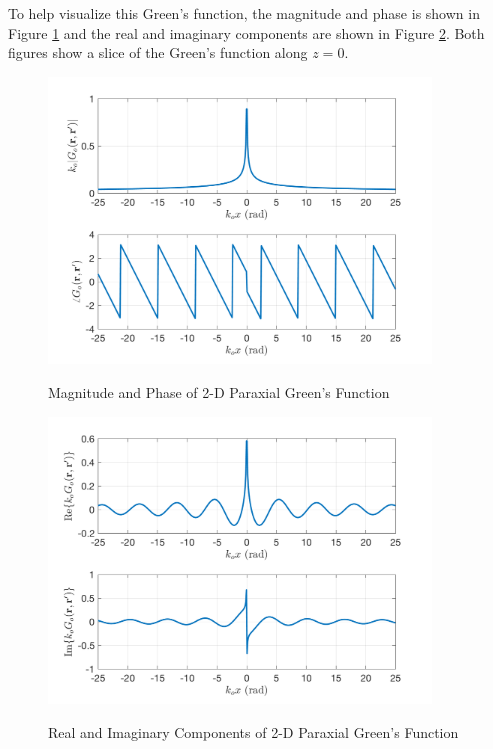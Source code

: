 To help visualize this Green's function, the magnitude and phase is shown in Figure \ref{gf_fig:5} and the real and imaginary components are shown in Figure \ref{gf_fig:6}. Both figures show a slice of the Green's function along $z = 0$. 

\begin{figure}[ht]
\begin{center}
\includegraphics[width=4in]{../media/2d_paraxial_gf_mag.png}
\end{center}
\renewcommand{\baselinestretch}{1}
\small\normalsize
\begin{quote}
\caption[Magnitude and Phase of 2-D Paraxial Green's Function]{Magnitude and Phase of 2-D Paraxial Green's Function \label{gf_fig:5}}
\end{quote}
\end{figure} 
\renewcommand{\baselinestretch}{2}
\small\normalsize

\begin{figure}[ht]
\begin{center}
\includegraphics[width=4in]{../media/2d_paraxial_gf_re_im.png}
\end{center}
\renewcommand{\baselinestretch}{1}
\small\normalsize
\begin{quote}
\caption[Real and Imaginary Components of 2-D Paraxial Green's Function]{Real and Imaginary Components of 2-D Paraxial Green's Function \label{gf_fig:6}}
\end{quote}
\end{figure} 
\renewcommand{\baselinestretch}{2}
\small\normalsize

